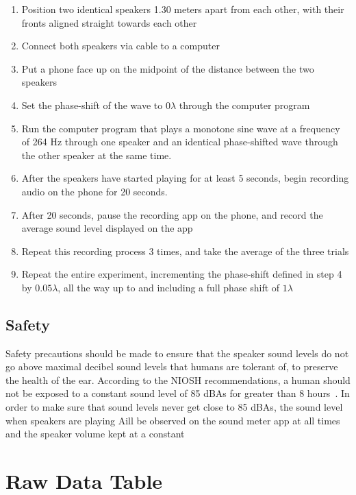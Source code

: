 \documentclass[index]{subfiles}
\begin{document}
\begin{enumerate}
    \item Position two identical speakers 1.30 meters apart from each other, with their fronts aligned straight towards each other
    \item Connect both speakers via cable to a computer
    \item Put a phone face up on the midpoint of the distance between the two speakers
    \item Set the phase-shift of the wave to \(0\lambda\) through the computer program
    \item Run the computer program that plays a monotone sine wave at a frequency of 264 Hz through one speaker and an identical phase-shifted wave through the other speaker at the same time.
    \item After the speakers have started playing for at least 5 seconds, begin recording audio on the phone for 20 seconds.
    \item After 20 seconds, pause the recording app on the phone, and record the average sound level displayed on the app
    \item Repeat this recording process 3 times, and take the average of the three trials
    \item Repeat the entire experiment, incrementing the phase-shift defined in step 4 by \(0.05\lambda\), all the way up to and including a full phase shift of \(1\lambda\)
\end{enumerate}

\subsection{Safety}

Safety precautions should be made to ensure that the speaker sound levels do not go above maximal decibel sound levels that humans are tolerant of, to preserve the health of the ear. According to the NIOSH recommendations, a human should not be exposed to a constant sound level of 85 dBAs for greater than 8 hours~\cite{cdc}. In order to make sure that sound levels never get close to 85 dBAs, the sound level when speakers are playing Aill be observed on the sound meter app at all times and the speaker volume kept at a constant

\section{Raw Data Table}
\end{document}
